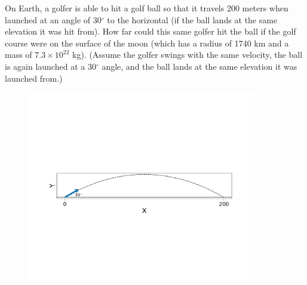 \question[20] On Earth, a golfer is able to hit a golf ball so that it travels 200 meters when launched at an angle of 30$^\circ$ to the horizontal (if the ball lands at the same elevation it was hit from). How far could this same golfer hit the ball if the golf course were on the surface of the moon (which has a radius of 1740 km and a mass of $7.3\times10^{22}$ kg). (Assume the golfer swings with the same velocity, the ball is again launched at a 30$^\circ$ angle, and the ball lands at the same elevation it was launched from.)

\begin{figure}[ht!]
	\centering
	\includegraphics[width=10cm]{projectile_motion}
\end{figure}